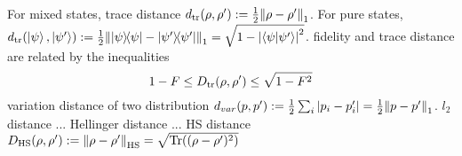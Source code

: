 \begin{definition}[distance]\label{def:distance}
	For mixed states, trace distance $d_{\tr}(\rho,\rho') : = \frac{1}{2} \norm{\rho-\rho'}_1$.
	For pure states, $d_{\tr}(\ket{\psi},\ket{\psi'}) : = \frac{1}{2}\norm{\op{\psi} -\op{\psi'}}_1 = \sqrt{1-\abs{\ip{\psi}{\psi'}}^2}$.
	fidelity and trace distance are related by the inequalities
	\begin{equation}
		1-F\le D_{\tr}(\rho,\rho') \le \sqrt{1-F^2}
	\end{equation}
	variation distance of two distribution $d_{var}(p,p') : = \frac{1}{2} \sum_i \abs{p_i-p_i'} = \frac{1}{2} \norm{p-p'}_1$.
	$l_2$ distance ... Hellinger distance ... HS distance $D_{\text{HS}}(\rho,\rho'): = \norm{\rho-\rho'}_{\text{HS}}=\sqrt{\Tr((\rho-\rho')^2)}$
\end{definition}


